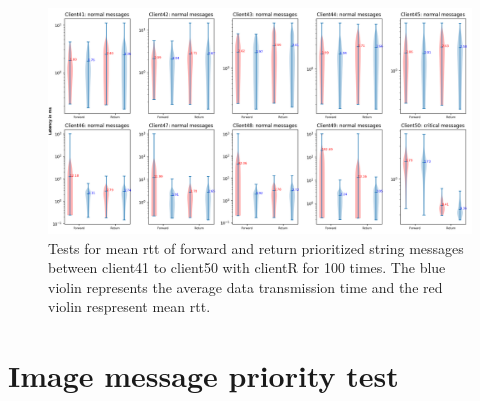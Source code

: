\begin{figure}
    \includegraphics[width=\textheight]{figures/appendix/priority_tests/log_violin_50clients_string_figure_5.png}\hfill 
    \caption{Tests for mean \gls{rtt} of forward and return prioritized string messages between client41 to client50 
    with clientR for 100 times. The blue violin represents the average data transmission time and the red violin 
    respresent mean \gls{rtt}.} \label{fig: priority-50clients-string-e}
\end{figure}



\section{Image message priority test}\label{chap: append-image-priority}


